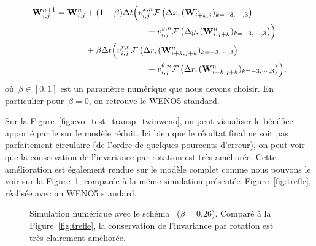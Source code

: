 \documentclass[main.tex]{subfiles}
\begin{document}
\begin{equation}\label{eq:twin-WENO5}
  \begin{split}
\W^{n+1}_{i,j} =\W^n_{i,j} &+ (1-\beta)\Delta t \Bigl(v_{i,j}^{x,n}
\mathcal{F}\left(\Delta x,(\W^n_{i+k,j})_{k=-3,\cdots, 3}\right) \\
&\hspace{25mm} + v_{i,j}^{y,n} \mathcal{F}\left(\Delta y,(\W^n_{i,j+k})_{k=-3,\cdots,3}\right)\Bigr)\\
&+\beta\Delta t \Bigl(v_{i,j}^{r,n}
\mathcal{F}\left(\Delta r,(\W^n_{i+k,j+k})_{k=-3,\cdots, 3}\right) \\
& \hspace{25mm} + v_{i,j}^{\theta,n} \mathcal{F}\left(\Delta r,(\W^n_{i-k,j+k})_{k=-3,\cdots, 3}\right)\Bigr),
  \end{split}
\end{equation}
où~$\beta\in[0,1]$ est un paramètre numérique que nous devons choisir. 
En particulier pour~$\beta=0$, on retrouve le WENO5 standard. 


Sur la Figure~\ref{fig:evo_test_transp_twinweno}, on peut visualiser le bénéfice apporté par le \twinweno sur le modèle réduit. Ici bien que le résultat final ne soit pas parfaitement circulaire (de l'ordre de quelques pourcents d'erreur), on peut voir que la conservation de l'invariance par rotation est très améliorée. Cette amélioration est également rendue sur le modèle complet comme nous pouvons le voir sur la Figure~\ref{fig:compWENO5}, comparée à la même simulation présentée~Figure~\ref{fig:trefle}, réalisée avec un WENO5 standard.

\begin{figure}[!htb]
\centering
{}
\caption{Simulation numérique avec le schéma \twinweno\  ($\beta=0.26$).  
Comparé à la Figure~\ref{fig:trefle}, la conservation de l'invariance par rotation est très clairement améliorée. 
}\label{fig:compWENO5}
\end{figure}

\end{document}
